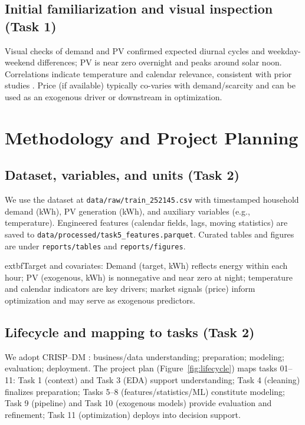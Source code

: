 \documentclass[12pt,a4paper]{article}
\begin{document}
\subsection{Initial familiarization and visual inspection (Task 1)}
Visual checks of demand and PV confirmed expected diurnal cycles and weekday-weekend differences; PV is near zero overnight and peaks around solar noon. Correlations indicate temperature and calendar relevance, consistent with prior studies \cite{Islam2017,Antonanzas2016}. Price (if available) typically co-varies with demand/scarcity and can be used as an exogenous driver or downstream in optimization.

\section{Methodology and Project Planning}
\subsection{Dataset, variables, and units (Task 2)}
We use the dataset at \texttt{data/raw/train\_252145.csv} with timestamped household demand (kWh), PV generation (kWh), and auxiliary variables (e.g., temperature). Engineered features (calendar fields, lags, moving statistics) are saved to \texttt{data/processed/task5\_features.parquet}. Curated tables and figures are under \texttt{reports/tables} and \texttt{reports/figures}.

	extbf{Target and covariates:} Demand (target, kWh) reflects energy within each hour; PV (exogenous, kWh) is nonnegative and near zero at night; temperature and calendar indicators are key drivers; market signals (price) inform optimization and may serve as exogenous predictors.

\subsection{Lifecycle and mapping to tasks (Task 2)}
We adopt CRISP--DM \cite{CRISPDM2000}: business/data understanding; preparation; modeling; evaluation; deployment. The project plan (Figure~\ref{fig:lifecycle}) maps tasks 01--11: Task 1 (context) and Task 3 (EDA) support understanding; Task 4 (cleaning) finalizes preparation; Tasks 5--8 (features/statistics/ML) constitute modeling; Task 9 (pipeline) and Task 10 (exogenous models) provide evaluation and refinement; Task 11 (optimization) deploys into decision support.
\end{document}

